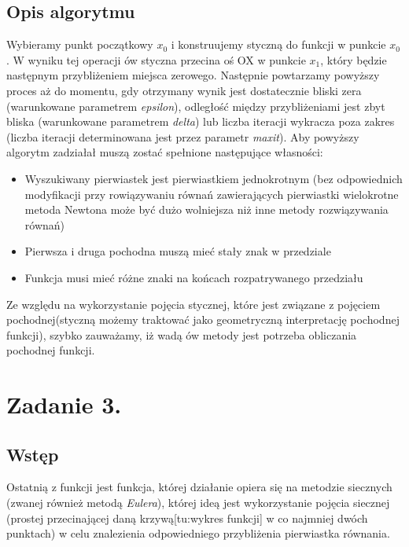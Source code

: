\documentclass[a4paper,14pt]{report}
\begin{document}
  \section{Opis algorytmu}
  Wybieramy punkt początkowy $x_{0}$ i konstruujemy styczną do funkcji w punkcie $x_{0}$. W wyniku tej operacji ów styczna przecina oś OX w punkcie $x_{1}$, który będzie następnym przybliżeniem miejsca zerowego. Następnie powtarzamy powyższy proces aż do momentu, gdy otrzymany wynik jest dostatecznie bliski zera (warunkowane parametrem \textit{epsilon}), odległość między przybliżeniami jest zbyt bliska (warunkowane parametrem \textit{delta}) lub liczba iteracji wykracza poza zakres (liczba iteracji determinowana jest przez parametr \textit{maxit}).
  Aby powyższy algorytm zadziałał muszą zostać spełnione następujące własności:
  \begin{itemize}
    \item Wyszukiwany pierwiastek jest pierwiastkiem jednokrotnym (bez odpowiednich modyfikacji przy rowiązywaniu równań zawierających pierwiastki wielokrotne metoda Newtona może być dużo wolniejsza niż inne metody rozwiązywania równań)
    \item Pierwsza i druga pochodna muszą mieć stały znak w przedziale
    \item Funkcja musi mieć różne znaki na końcach rozpatrywanego przedziału
  \end{itemize}
  Ze względu na wykorzystanie pojęcia stycznej, które jest związane z pojęciem pochodnej(styczną możemy traktować jako geometryczną interpretację pochodnej funkcji), szybko zauważamy, iż wadą ów metody jest potrzeba obliczania pochodnej funkcji.
\chapter{Zadanie 3.}
  \section{Wstęp}
  Ostatnią z funkcji jest funkcja, której działanie opiera się na metodzie siecznych (zwanej również metodą \textit{Eulera}), której ideą jest wykorzystanie pojęcia siecznej (prostej przecinającej daną krzywą[tu:wykres funkcji] w co najmniej dwóch punktach) w celu znalezienia odpowiedniego przybliżenia pierwiastka równania.
\end{document}
